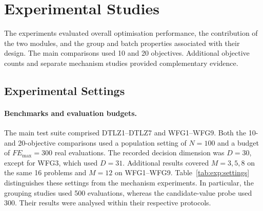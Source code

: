 \section{Experimental Studies}
\label{sec:exp}

The experiments evaluated overall optimisation performance, the contribution
of the two modules, and the group and batch properties associated with their
design. The main comparisons used 10 and 20 objectives. Additional objective
counts and separate mechanism studies provided complementary evidence.

\subsection{Experimental Settings}
\label{sec:exp:settings}

\paragraph{Benchmarks and evaluation budgets.}
The main test suite comprised DTLZ1--DTLZ7 and WFG1--WFG9. Both the 10- and
20-objective comparisons used a population setting of $N=100$ and a budget of
$FE_{\max}=300$ real evaluations. The recorded decision dimension was $D=30$,
except for WFG3, which used $D=31$. Additional results covered $M=3,5,8$ on the
same 16 problems and $M=12$ on WFG1--WFG9. Table~\ref{tab:exp:settings}
distinguishes these settings from the mechanism experiments. In particular,
the grouping studies used 500 evaluations, whereas the candidate-value probe
used 300. Their results were analysed within their respective protocols.

